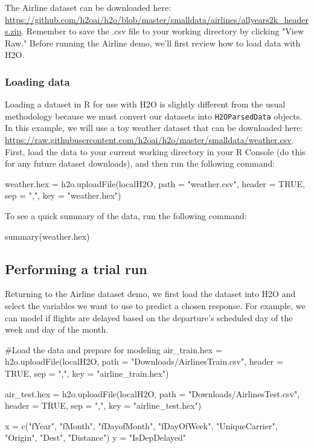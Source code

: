 \documentclass[11pt]{article}
\begin{document}
The Airline dataset can be downloaded here: \url{https://github.com/h2oai/h2o/blob/master/smalldata/airlines/allyears2k_headers.zip}. Remember to save the .csv file to your working directory by clicking  "View Raw."  Before running the Airline demo, we'll first review how to load data with H2O. 

\subsubsection{Loading data} \label{2.5}

Loading a dataset in R for use with H2O is slightly different from the usual methodology because we must convert our datasets into \texttt{H2OParsedData} objects. In this example, we will use a toy weather dataset that can be downloaded here:\\ 
\url{https://raw.githubusercontent.com/h2oai/h2o/master/smalldata/weather.csv}. 
First, load the data to your current working directory in your R Console (do this for any future dataset downloads), and then run the following command:
\begin{spverbatim}
weather.hex = h2o.uploadFile(localH2O, path = "weather.csv", header = TRUE, sep = ",", key = "weather.hex")
\end{spverbatim}
\bigskip
\noindent
To see a quick summary of the data, run the following command:
\begin{spverbatim}
summary(weather.hex)
\end{spverbatim}


\subsection{Performing a trial run} \label{3.2}
Returning to the Airline dataset demo, we first load the dataset into H2O and select the variables we want to use to predict a chosen response. For example, we can model if flights are delayed based on the departure's scheduled day of the week and day of the month.

\begin{spverbatim}

#Load the data and prepare for modeling
air_train.hex = h2o.uploadFile(localH2O, path = "Downloads/AirlinesTrain.csv", header = TRUE, sep = ",", key = "airline_train.hex")

air_test.hex = h2o.uploadFile(localH2O, path = "Downloads/AirlinesTest.csv", header = TRUE, sep = ",", key = "airline_test.hex")

x = c("fYear", "fMonth", "fDayofMonth", "fDayOfWeek", "UniqueCarrier", "Origin", "Dest", "Distance")
y = "IsDepDelayed" 

\end{spverbatim}
\end{document}
